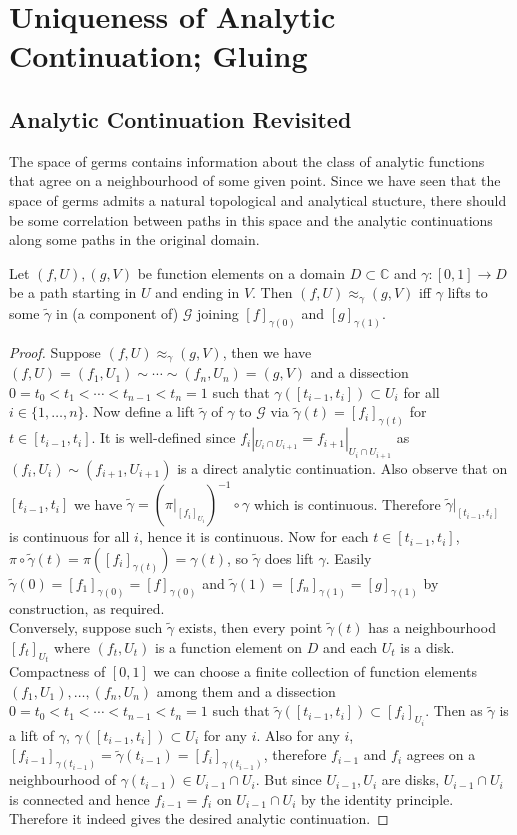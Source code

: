 \section{Uniqueness of Analytic Continuation; Gluing}
\subsection{Analytic Continuation Revisited}
The space of germs contains information about the class of analytic functions that agree on a neighbourhood of some given point.
Since we have seen that the space of germs admits a natural topological and analytical stucture, there should be some correlation between paths in this space and the analytic continuations along some paths in the original domain.
\begin{theorem}
    Let $(f,U),(g,V)$ be function elements on a domain $D\subset\mathbb C$ and $\gamma:[0,1]\to D$ be a path starting in $U$ and ending in $V$.
    Then $(f,U)\approx_\gamma (g,V)$ iff $\gamma$ lifts to some $\tilde{\gamma}$ in (a component of) $\mathcal G$ joining $[f]_{\gamma(0)}$ and $[g]_{\gamma(1)}$.
\end{theorem}
\begin{proof}
    Suppose $(f,U)\approx_\gamma(g,V)$, then we have $(f,U)=(f_1,U_1)\sim\cdots\sim (f_n,U_n)=(g,V)$ and a dissection $0=t_0<t_1<\cdots <t_{n-1}<t_n=1$ such that $\gamma([t_{i-1},t_i])\subset U_i$ for all $i\in\{1,\ldots,n\}$.
    Now define a lift $\tilde{\gamma}$ of $\gamma$ to $\mathcal G$ via $\tilde{\gamma}(t)=[f_i]_{\gamma(t)}$ for $t\in[t_{i-1},t_i]$.
    It is well-defined since $f_i|_{U_i\cap U_{i+1}}=f_{i+1}|_{U_i\cap U_{i+1}}$ as $(f_i,U_i)\sim (f_{i+1},U_{i+1})$ is a direct analytic continuation.
    Also observe that on $[t_{i-1},t_i]$ we have $\tilde{\gamma}=(\pi|_{[f_i]_{U_i}})^{-1}\circ\gamma$ which is continuous.
    Therefore $\tilde{\gamma}|_{[t_{i-1},t_i]}$ is continuous for all $i$, hence it is continuous.
    Now for each $t\in[t_{i-1},t_i]$, $\pi\circ\tilde{\gamma}(t)=\pi([f_i]_{\gamma(t)})=\gamma(t)$, so $\tilde{\gamma}$ does lift $\gamma$.
    Easily $\tilde{\gamma}(0)=[f_1]_{\gamma(0)}=[f]_{\gamma(0)}$ and $\tilde{\gamma}(1)=[f_n]_{\gamma(1)}=[g]_{\gamma(1)}$ by construction, as required.\\
    Conversely, suppose such $\tilde\gamma$ exists, then every point $\tilde{\gamma}(t)$ has a neighbourhood $[f_t]_{U_t}$ where $(f_t,U_t)$ is a function element on $D$ and each $U_t$ is a disk.
    Compactness of $[0,1]$ we can choose a finite collection of function elements $(f_1,U_1),\ldots,(f_n,U_n)$ among them and a dissection $0=t_0<t_1<\cdots <t_{n-1}<t_n=1$ such that $\tilde{\gamma}([t_{i-1},t_i])\subset [f_i]_{U_i}$.
    Then as $\tilde\gamma$ is a lift of $\gamma$, $\gamma([t_{i-1},t_i])\subset U_i$ for any $i$.
    Also for any $i$, $[f_{i-1}]_{\gamma(t_{i-1})}=\tilde{\gamma}(t_{i-1})=[f_i]_{\gamma(t_{i-1})}$, therefore $f_{i-1}$ and $f_i$ agrees on a neighbourhood of $\gamma(t_{i-1})\in U_{i-1}\cap U_i$.
    But since $U_{i-1},U_i$ are disks, $U_{i-1}\cap U_i$ is connected and hence $f_{i-1}=f_i$ on $U_{i-1}\cap U_i$ by the identity principle.
    Therefore it indeed gives the desired analytic continuation.
\end{proof}
